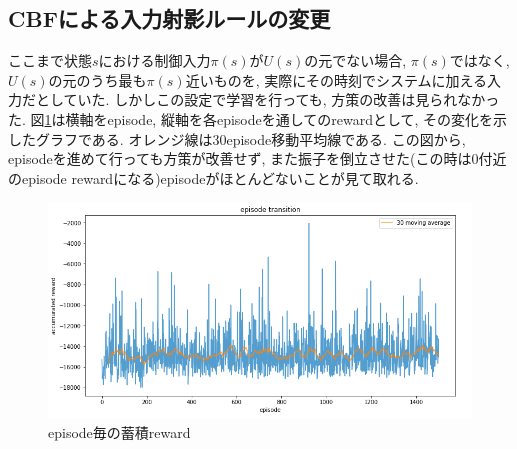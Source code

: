 \documentclass{jsarticle}
\begin{document}
\subsection{CBFによる入力射影ルールの変更}
ここまで状態$s$における制御入力$\pi(s)$が$U(s)$の元でない場合, $\pi(s)$ではなく, $U(s)$の元のうち最も$\pi(s)$近いものを, 実際にその時刻でシステムに加える入力だとしていた. しかしこの設定で学習を行っても, 方策の改善は見られなかった. 図\ref{pure_reward}は横軸をepisode, 縦軸を各episodeを通してのrewardとして, その変化を示したグラフである. オレンジ線は30episode移動平均線である. この図から, episodeを進めて行っても方策が改善せず, また振子を倒立させた(この時は0付近のepisode rewardになる)episodeがほとんどないことが見て取れる.
\begin{figure}[h]
	\centering
 	\includegraphics[width=12cm]{pure_reward.png}
 	\caption{episode毎の蓄積reward} \label{pure_reward}
\end{figure}\\
\end{document}
